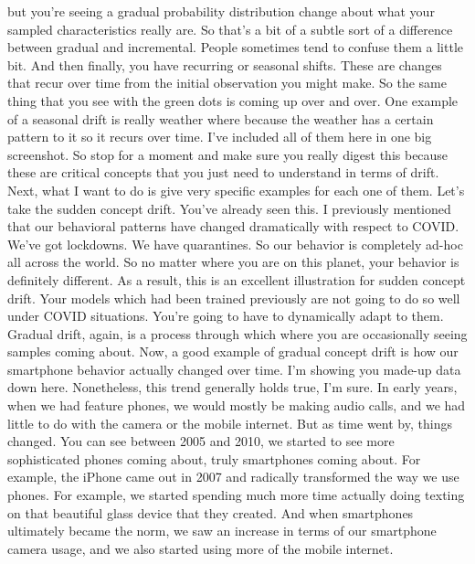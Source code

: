 {{{{{{{{    but you're seeing a gradual probability distribution
    change about what your sampled characteristics really are.
    So that's a bit of a subtle sort of a difference
    between gradual and incremental.
    People sometimes tend to confuse them a little bit.
    And then finally, you have recurring or seasonal shifts.
    These are changes that recur over time from the initial observation you
    might make.
    So the same thing that you see with the green dots is coming up over and over.
    One example of a seasonal drift is really
    weather where because the weather has a certain pattern to it
    so it recurs over time.
    I've included all of them here in one big screenshot.
    So stop for a moment and make sure you really digest this
    because these are critical concepts that you just
    need to understand in terms of drift.
    Next, what I want to do is give very specific examples for each one of them.
    Let's take the sudden concept drift.
    You've already seen this.
    I previously mentioned that our behavioral patterns have changed
    dramatically with respect to COVID.
    We've got lockdowns.
    We have quarantines.
    So our behavior is completely ad-hoc all across the world.
    So no matter where you are on this planet,
    your behavior is definitely different.
    As a result, this is an excellent illustration for sudden concept drift.
    Your models which had been trained previously
    are not going to do so well under COVID situations.
    You're going to have to dynamically adapt to them.
    Gradual drift, again, is a process through which
    where you are occasionally seeing samples coming about.
    Now, a good example of gradual concept drift
    is how our smartphone behavior actually changed over time.
    I'm showing you made-up data down here.
    Nonetheless, this trend generally holds true, I'm sure.
    In early years, when we had feature phones,
    we would mostly be making audio calls, and we had little
    to do with the camera or the mobile internet.
    But as time went by, things changed.
    You can see between 2005 and 2010, we started
    to see more sophisticated phones coming about, truly smartphones coming about.
    For example, the iPhone came out in 2007 and radically transformed
    the way we use phones.
    For example, we started spending much more time actually doing
    texting on that beautiful glass device that they created.
    And when smartphones ultimately became the norm,
    we saw an increase in terms of our smartphone camera usage,
    and we also started using more of the mobile internet.
}}}}}}}}
